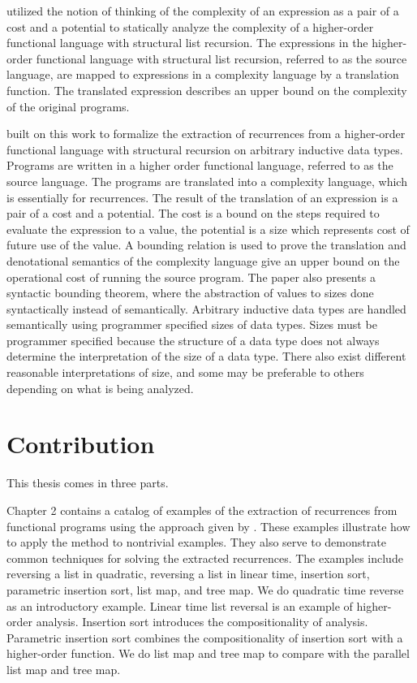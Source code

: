 \citet{Danner2013} utilized the notion of thinking of the complexity of an
expression as a pair of a cost and a potential to statically analyze the
complexity of a higher-order functional language with structural list
recursion.  The expressions in the higher-order functional language with
structural list recursion, referred to as the source language, are mapped to
expressions in a complexity language by a translation function.  The translated
expression describes an upper bound on the complexity of the original programs.



\citet{Danner2015} built on this work to formalize the extraction
of recurrences from a higher-order functional language with structural
recursion on arbitrary inductive data types. Programs are written in a higher
order functional language, referred to as the source language. The programs are
translated into a complexity language, which is essentially for recurrences.
The result of the translation of an expression is a pair of a cost and a
potential. The cost is a bound on the steps required to evaluate the expression
to a value, the potential is a size which represents cost of future use of the
value. A bounding relation is used to prove the translation and denotational
semantics of the complexity language give an upper bound on the operational
cost of running the source program. The paper also presents a syntactic
bounding theorem, where the abstraction of values to sizes done syntactically
instead of semantically.  Arbitrary inductive data types are handled
semantically using programmer specified sizes of data types. Sizes must be
programmer specified because the structure of a data type does not always
determine the interpretation of the size of a data type. There also exist
different reasonable interpretations of size, and some may be preferable to
others depending on what is being analyzed.


\section{Contribution}

This thesis comes in three parts.



Chapter 2 contains a catalog of examples of the extraction of recurrences
from functional programs using the approach given by \citet{Danner2015}. These
examples illustrate how to apply the method to nontrivial examples. They also
serve to demonstrate common techniques for solving the extracted recurrences.
The examples include reversing a list in quadratic, reversing a list in linear
time, insertion sort, parametric insertion sort, list map, and tree map. We do
quadratic time reverse as an introductory example. Linear time list reversal is
an example of higher-order analysis. Insertion sort introduces the
compositionality of analysis. Parametric insertion sort combines the
compositionality of insertion sort with a higher-order function. We do list map
and tree map to compare with the parallel list map and tree map.




